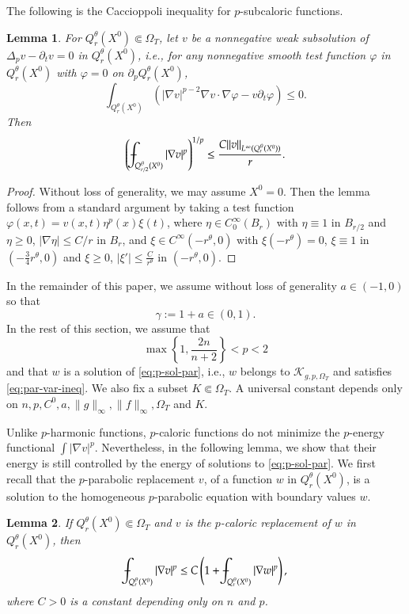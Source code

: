 \documentclass[11pt,oneside,english]{amsart}
\newcommand{\cK}{{\mathcal K}}
\newcommand{\vp}{\varphi}
\newcommand{\D}{\nabla}
\numberwithin{equation}{section}
\def\Xint#1{\mathchoice
  {\XXint\displaystyle\textstyle{#1}}%
  {\XXint\textstyle\scriptstyle{#1}}%
  {\XXint\scriptstyle\scriptscriptstyle{#1}}%
  {\XXint\scriptscriptstyle\scriptscriptstyle{#1}}%
  \!\int}
\def\XXint#1#2#3{{\setbox0=\hbox{$#1{#2#3}{\int}$}
    \vcenter{\hbox{$#2#3$}}\kern-.5\wd0}}
\def\dashint{\Xint-}
\theoremstyle{plain}
\newtheorem{lemma}{Lemma}
\numberwithin{equation}{section}
\begin{document}
The following is the Caccioppoli inequality for $p$-subcaloric functions.

\begin{lemma}
    \label{lem:Caccio}
    For $Q^\theta_r(X^0)\Subset \Omega_T$, let $v$ be a nonnegative weak subsolution of $\Delta_pv-\partial_tv=0$ in $Q^\theta_r(X^0)$, i.e., for any nonnegative smooth test function $\vp$ in $Q^\theta_r(X^0)$ with $\vp=0$ on $\partial_pQ^\theta_r(X^0)$,
    $$
    \int_{Q_r^\theta(X^0)}\left(|\D v|^{p-2}\D v\cdot\D\vp-v\partial_t\vp\right)\le0.
    $$
    Then
    $$
    \left(\dashint_{Q^\theta_{r/2}(X^0)}|\D v|^{p}\right)^{1/p}\le \frac{C\|v\|_{L^\infty(Q^\theta_r(X^0))} }{r}.
    $$
\end{lemma}

\begin{proof}
Without loss of generality, we may assume $X^0=0$. Then the lemma follows from a standard argument by taking a test function $\vp(x,t)=v(x,t)\eta^p(x)\xi(t)$, where $\eta\in C^\infty_0(B_r)$ with $\eta\equiv1$ in $B_{r/2}$ and $\eta\ge0$, $|\D \eta|\le C/r$ in $B_r$, and $\xi\in C^\infty(-r^\theta,0)$ with $\xi(-r^\theta)=0$, $\xi\equiv 1$ in $(-\frac34r^\theta,0)$ and $\xi\ge0$, $|\xi'|\le \frac{C}{r^\theta}$ in $(-r^\theta,0)$. 
\end{proof}

In the remainder of this paper, we assume without loss of generality $a\in(-1,0)$ so that
$$
\gamma:=1+a\in(0,1).
$$
In the rest of this section, we assume that 
$$
\max\left\{1,\frac{2n}{n+2}\right\}<p<2
$$ 
and that $w$ is a solution of \eqref{eq:p-sol-par}, i.e., $w$ belongs to $\cK_{g,p,\Omega_T}$ and satisfies \eqref{eq:par-var-ineq}. We also fix a subset $K\Subset \Omega_T$. A universal constant depends only on $n,p,C^0,a,\|g\|_\infty,\|f\|_\infty,\Omega_T$ and $K$.


Unlike $p$-harmonic functions, $p$-caloric functions do not minimize the $p$-energy functional $\int|\D v|^p$. Nevertheless, in the following lemma, we show that their energy is still controlled by the energy of solutions to \eqref{eq:p-sol-par}.
We first recall that the $p$-parabolic replacement $v$, of a function $w$ in $Q_r^\theta(X^0)$, is a solution to the homogeneous  $p$-parabolic equation with boundary values $w$.



\begin{lemma}
    \label{lem:u-v-p-est-comp}
    If $Q_r^\theta(X^0)\Subset\Omega_T$ and $v$ is the $p$-caloric replacement of $w$ in $Q_r^\theta(X^0)$, then
    $$
    \dashint_{Q_r^\theta(X^0)}|\D v|^p\le C\left(1+\dashint_{Q_r^\theta(X^0)}|\D w|^p\right),
    $$
    where $C>0$ is a constant depending only on $n$ and $p$.
\end{lemma}
\end{document}
